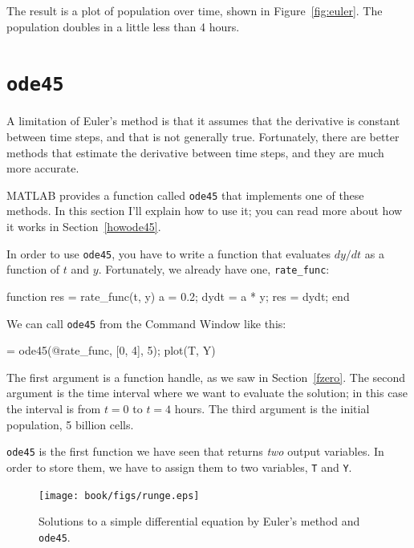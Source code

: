 \documentclass[main.tex]{subfiles}
\begin{document}
The result is a plot of population over time, shown in Figure~\ref{fig:euler}.  The population doubles in a little less than 4 hours.


\section{{\tt ode45}}
\label{ode45}


A limitation of Euler's method is that it assumes that the derivative is constant between time steps, and that is not generally true.  Fortunately, there are better methods that estimate the derivative between time steps, and they are much more accurate.


MATLAB provides a function called {\tt ode45} that implements one of these methods.  In this section I'll explain how to use it; you can read more about how it works in Section~\ref{howode45}.


In order to use {\tt ode45}, you have to write a function that evaluates $dy/dt$ as a function of $t$ and $y$.  Fortunately, we already have one, \verb"rate_func":

\begin{code}
function res = rate_func(t, y)
   a = 0.2;
   dydt = a * y;
   res = dydt;
end
\end{code}

We can call {\tt ode45} from the {\sf Command Window} like this:

\begin{code}
[T, Y] = ode45(@rate_func, [0, 4], 5);
plot(T, Y)
\end{code}

The first argument is a function handle, as we saw in Section~\ref{fzero}.  The second argument is the time interval where we want to evaluate the solution; in this case the interval is from $t=0$ to $t=4$ hours.  The third argument is the initial population, 5 billion cells.


{\tt ode45} is the first function we have seen that returns {\em two} output variables.  In order to store them, we have to assign them to two variables, {\tt T} and {\tt Y}.

\begin{figure}
\centerline{\texttt{[image: book/figs/runge.eps]}}
\caption{Solutions to a simple differential equation by Euler's method and {\tt ode45}.}
\label{fig:runge}
\end{figure}
\end{document}

